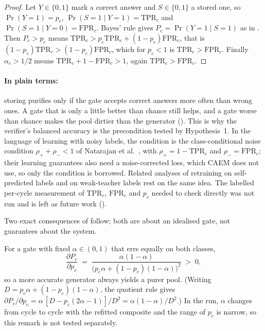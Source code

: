 \begin{proof}
Let $Y \in \{0,1\}$ mark a correct answer and $S \in \{0,1\}$ a stored one, so $\Pr(Y=1) = p_c$, $\Pr(S=1 \mid Y=1) = \mathrm{TPR}_c$ and $\Pr(S=1 \mid Y=0) = \mathrm{FPR}_c$. Bayes' rule gives $P_c = \Pr(Y=1 \mid S=1)$ as in . Then $P_c > p_c$ means $\mathrm{TPR}_c > p_c \mathrm{TPR}_c + (1-p_c)\mathrm{FPR}_c$, that is $(1-p_c)\mathrm{TPR}_c > (1-p_c)\mathrm{FPR}_c$, which for $p_c < 1$ is $\mathrm{TPR}_c > \mathrm{FPR}_c$. Finally $\alpha_c > 1/2$ means $\mathrm{TPR}_c + 1 - \mathrm{FPR}_c > 1$, again $\mathrm{TPR}_c > \mathrm{FPR}_c$.
\end{proof}

\paragraph{In plain terms:} storing purifies only if the gate accepts correct answers more often than wrong ones. A gate that is only a little better than chance still helps, and a gate worse than chance makes the pool dirtier than the generator (). This is why the verifier's balanced accuracy is the precondition tested by Hypothesis~1. In the language of learning with noisy labels, the condition is the class-conditional noise condition $\rho_{+} + \rho_{-} < 1$ of Natarajan et al.~\cite{natarajan2013learning}, with $\rho_{+} = 1-\mathrm{TPR}_c$ and $\rho_{-} = \mathrm{FPR}_c$; their learning guarantees also need a noise-corrected loss, which CAEM does not use, so only the condition is borrowed. Related analyses of retraining on self-predicted labels \cite{das2025retraining} and on weak-teacher labels \cite{lang2024w2s} rest on the same idea. The labelled per-cycle measurement of $\mathrm{TPR}_c$, $\mathrm{FPR}_c$ and $p_c$ needed to check  directly was not run and is left as future work ().



Two exact consequences of  follow; both are about an idealised gate, not guarantees about the system.

\begin{remark}
\label{thm:monotone-purification}
For a gate with fixed $\alpha \in (0,1)$ that errs equally on both classes,
\begin{equation}
\frac{\partial P_c}{\partial p_c} \;=\; \frac{\alpha(1-\alpha)}{\big(p_c \alpha + (1-p_c)(1-\alpha)\big)^{2}} \;>\; 0,
\label{eq:monotone-purification}
\end{equation}
so a more accurate generator always yields a purer pool. (Writing $D = p_c\alpha + (1-p_c)(1-\alpha)$, the quotient rule gives $\partial P_c / \partial p_c = \alpha\,[D - p_c(2\alpha - 1)]/D^{2} = \alpha(1-\alpha)/D^{2}$.) In the run, $\alpha$ changes from cycle to cycle with the refitted composite and the range of $p_c$ is narrow, so this remark is not tested separately.
\end{remark}

